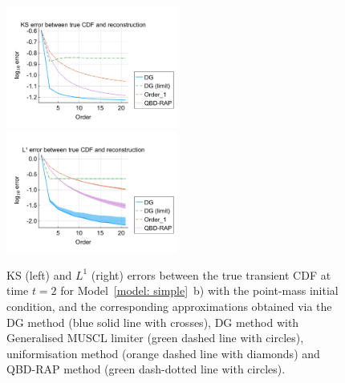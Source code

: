 \begin{figure}
	\centering
	\includegraphics[width=0.5\textwidth,trim={0.75cm 0.8cm 0.25cm 1.25cm},clip]{chapter6/figs/hitting_times_model/reflecting_model/transient_distribution/point_mass/ks_error_formatted.pdf}%
	\includegraphics[width=0.5\textwidth,trim={0.75cm 0.8cm 0.25cm 1.25cm},clip]{chapter6/figs/hitting_times_model/reflecting_model/transient_distribution/point_mass/l1_cdf_error_formatted.pdf}
	\caption{KS (left) and \(L^1\) (right) errors between the true transient CDF at time \(t=2\) for Model~\ref{model: simple}~b) with the point-mass initial condition, and the corresponding approximations obtained via the DG method (blue solid line with crosses), DG method with Generalised MUSCL limiter (green dashed line with circles), uniformisation method (orange dashed line with diamonds) and QBD-RAP method (green dash-dotted line with circles).} 
	\label{fig: reflecting transient pm} 
\end{figure}

